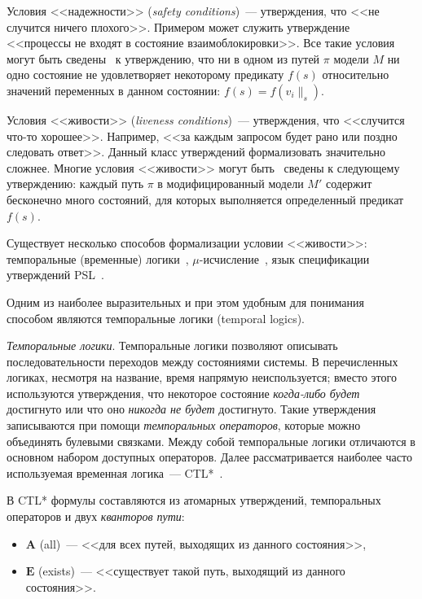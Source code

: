 \documentclass[a4paper,notitlepage,14pt]{article}
\begin{document}
Условия <<надежности>> (\emph{safety conditions})~--- утверждения, что <<не случится
ничего плохого>>. Примером может служить утверждение <<процессы не входят в состояние
взаимоблокировки>>. Все такие условия могут быть сведены~\cite{Clarke} к утверждению, что
ни в одном из путей $\pi$ модели $M$ ни одно состояние не удовлетворяет некоторому
предикату $f(s)$ относительно значений переменных в данном состоянии: $f(s) = f(v_i\|_s)$.

Условия <<живости>> (\emph{liveness conditions})~--- утверждения, что <<случится что-то
хорошее>>. Например, <<за каждым запросом будет рано или поздно следовать ответ>>. Данный
класс утверждений формализовать значительно сложнее. Многие условия <<живости>> могут
быть~\cite{Clarke97anotherlook} сведены к следующему утверждению: каждый путь $\pi$ в
модифицированный модели $M'$ содержит бесконечно много состояний, для которых выполняется
определенный предикат $f(s)$.

Существует несколько способов формализации условии <<живости>>: темпоральные (временные)
логики~\cite{Clarke,Pandya01modelchecking},
$\mu$-исчисление~\cite{Leucker_parallelmodel,Emerson97modelchecking}, язык спецификации
утверждений PSL~\cite{Glazberg_psl:beyond}.

Одним из наиболее выразительных и при этом удобным для понимания~\cite{Stirling96modaland}
способом являются темпоральные логики (temporal logics).

\textit{Темпоральные логики}. Темпоральные логики позволяют описывать последовательности
переходов между состояниями системы. В перечисленных логиках, несмотря на название, время
напрямую неиспользуется; вместо этого используются утверждения, что некоторое состояние
\emph{когда-либо будет} достигнуто или что оно \emph{никогда не будет} достигнуто. Такие
утверждения записываются при помощи \emph{темпоральных операторов}, которые можно
объединять булевыми связками. Между собой темпоральные логики отличаются в основном
набором доступных операторов. Далее рассматривается наиболее часто используемая временная
логика~--- CTL*~\cite{Stirling96modaland}.

В CTL* формулы составляются из атомарных утверждений, темпоральных операторов и
двух \emph{кванторов пути}:

\begin{itemize}
\item $\mathbf{A}$ (all)~--- <<для всех путей, выходящих из данного состояния>>,
\item $\mathbf{E}$ (exists)~--- <<существует такой путь, выходящий из данного состояния>>.
\end{itemize}
\end{document}
